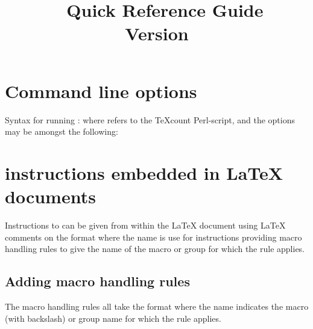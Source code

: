 \documentclass{article}
\title{\TeXcount{}\copyrightfootnote{}~
Quick Reference Guide\\
Version \version
}
\begin{document}
\maketitle

\section{Command line options}

Syntax for running \TeXcount{}:
where  refers to the TeXcount Perl-script, and the options may be amongst the following:




\section{\TeXcount{} instructions embedded in \LaTeX{} documents}

Instructions to \TeXcount{} can be given from within the
\LaTeX{} document using \LaTeX{} comments on the format
where the name is use for instructions providing macro handling rules to give the name of the macro or group for which the rule applies.



\subsection{Adding macro handling rules}

The macro handling rules all take the format
where the name indicates the macro (with backslash) or group name for which the rule applies.


\end{document}
